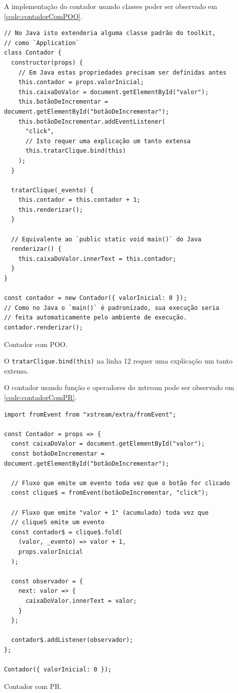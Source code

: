 A implementação do contador usando classes poder ser observado em
\ref{code:contadorComPOO}.

\begin{listing}[htbp]
\begin{verbatim}
// No Java isto extenderia alguma classe padrão do toolkit,
// como `Application`
class Contador {
  constructor(props) {
    // Em Java estas propriedades precisam ser definidas antes
    this.contador = props.valorInicial;
    this.caixaDoValor = document.getElementById("valor");
    this.botãoDeIncrementar = document.getElementById("botãoDeIncrementar");
    this.botãoDeIncrementar.addEventListener(
      "click",
      // Isto requer uma explicação um tanto extensa
      this.tratarClique.bind(this)
    );
  }

  tratarClique(_evento) {
    this.contador = this.contador + 1;
    this.renderizar();
  }

  // Equivalente ao `public static void main()` do Java
  renderizar() {
    this.caixaDoValor.innerText = this.contador;
  }
}

const contador = new Contador({ valorInicial: 0 });
// Como no Java o `main()` é padronizado, sua execução seria
// feita automaticamente pelo ambiente de execução.
contador.renderizar();
\end{verbatim}
\caption{\label{code:contadorComPOO}Contador com POO.}
\end{listing}

O \texttt{tratarClique.bind(this)} na linha 12 requer uma explicação um tanto
extensa.

O contador usando função e operadores do xstream pode ser observado em
\ref{code:contadorComPR}.

\begin{listing}[htbp]
\begin{verbatim}
import fromEvent from "xstream/extra/fromEvent";

const Contador = props => {
  const caixaDoValor = document.getElementById("valor");
  const botãoDeIncrementar = document.getElementById("botãoDeIncrementar");

  // Fluxo que emite um evento toda vez que o botão for clicado
  const clique$ = fromEvent(botãoDeIncrementar, "click");

  // Fluxo que emite "valor + 1" (acumulado) toda vez que
  // cliqueS emite um evento
  const contador$ = clique$.fold(
    (valor, _evento) => valor + 1,
    props.valorInicial
  );

  const observador = {
    next: valor => {
      caixaDoValor.innerText = valor;
    }
  };

  contador$.addListener(observador);
};

Contador({ valorInicial: 0 });
\end{verbatim}
\caption{\label{code:contadorComPR}Contador com PR.}
\end{listing}

